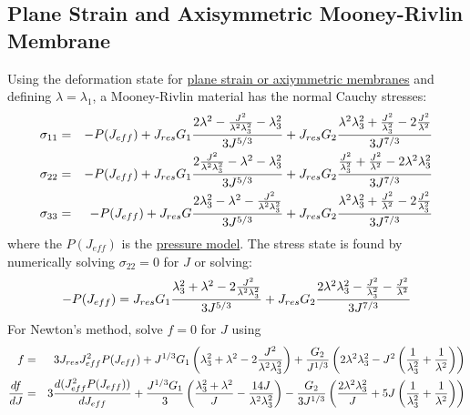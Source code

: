 \documentclass[11pt]{book}
\def\Jeff{J_{eff}}
\def\Jres{J_{res}}
\begin{document}
\subsection{Plane Strain and Axisymmetric Mooney-Rivlin Membrane}

Using the deformation state for \hyperref[MMT]{plane strain or axiymmetric membranes} and defining $\lambda=\lambda_1$, a Mooney-Rivlin material has the normal Cauchy stresses:
\begin{eqnarray}
      \sigma_{11} & = & -P(\Jeff) + \Jres G_1{2\lambda^2-{J^2\over\lambda^2\lambda_3^2}-\lambda_3^2\over 3J^{5/3}} 
                                  + \Jres G_2{\lambda^2\lambda_3^2 + {J^2\over \lambda_3^2} -2{J^2\over\lambda^2}\over 3J^{7/3}} \\
      \sigma_{22} & = & -P(\Jeff) + \Jres G_1{2{J^2\over\lambda^2\lambda_3^2}-\lambda^2-\lambda_3^2\over 3J^{5/3}}
                                  + \Jres G_2{{J^2\over\lambda_3^2} + {J^2\over\lambda^2}-2\lambda^2\lambda_3^2\over 3J^{7/3}}  \\
      \sigma_{33} & = & -P(\Jeff) + \Jres G{2\lambda_3^2-\lambda^2-{J^2\over\lambda^2\lambda_3^2}\over 3J^{5/3}} 
                                  + \Jres G_2{\lambda^2\lambda_3^2 + {J^2\over\lambda^2}-2{J^2\over \lambda_3^2}\over 3J^{7/3}}
\end{eqnarray}
where the $P(\Jeff)$ is the \hyperref[PTerms]{pressure model}. The stress state is found by numerically solving $\sigma_{22}=0$ for $J$ or solving:
\begin{equation}
	-P(\Jeff) =  \Jres G_1{\lambda_3^2+\lambda^2-2{J^2\over\lambda^2\lambda_3^2}\over 3J^{5/3}} + 
	             \Jres G_2{2\lambda^2\lambda_3^2 - {J^2\over \lambda_3^2} - {J^2\over\lambda^2}\over 3J^{7/3}}
\end{equation}
For Newton's method, solve $f=0$ for $J$ using
\begin{eqnarray}
	f & = & 3 \Jres \Jeff^2 P(\Jeff) + J^{1/3} G_1\left(\lambda_3^2+\lambda^2-2{J^2\over\lambda^2\lambda_3^2}\right)
	                         + {G_2\over J^{1/3}}\left(2\lambda^2\lambda_3^2 - J^2\left({1\over \lambda_3^2}
	                         +{1\over\lambda^2}\right)\right)     \nonumber \\
	{df\over dJ} & = & 3 {d(\Jeff^2 P(\Jeff))\over d\Jeff} + {J^{1/3}G_1\over3}\left({\lambda_3^2+\lambda^2\over J}-{14J\over\lambda^2\lambda_3^2}\right)
	          - {G_2\over3J^{1/3}}\left({2\lambda^2\lambda_3^2\over J}+5J\left({1\over \lambda_3^2}+{1\over\lambda^2}\right)\right)
	          \nonumber \\
\end{eqnarray}
\end{document}
